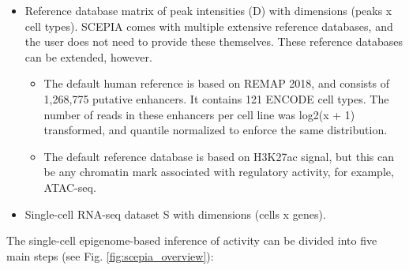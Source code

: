 \begin{itemize}
	\item Reference database matrix of peak intensities (D) with dimensions (peaks x cell types). SCEPIA comes with multiple extensive reference databases, and the user does not need to provide these themselves. These reference databases can be extended, however.
    \begin{itemize}
        \item The default human reference is based on REMAP 2018\cite{Chneby2017}, and consists of 1,268,775 putative enhancers. It contains 121 ENCODE\cite{encode_dcc} cell types. The number of reads in these enhancers per cell line was log2(x + 1) transformed, and quantile normalized\cite{qnorm} to enforce the same distribution.
        \item The default reference database is based on H3K27ac signal, but this can be any chromatin mark associated with regulatory activity, for example, ATAC-seq.
    \end{itemize}
	\item Single-cell RNA-seq dataset S with dimensions (cells x genes). 
\end{itemize}

\noindent
The single-cell epigenome-based inference of activity can be divided into five main steps (see Fig. \ref{fig:scepia_overview}):

